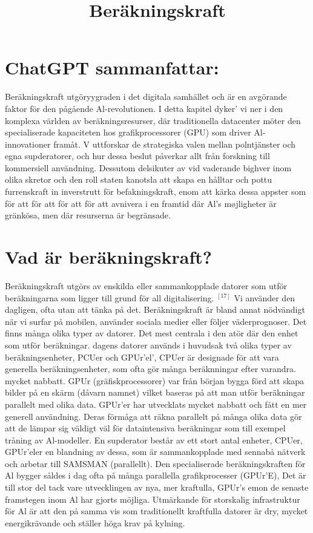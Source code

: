 {{{{{{{{{{{{{\title{
Beräkningskraft
}
\section*{ChatGPT sammanfattar:}
Beräkningskraft utgöryygraden i det digitala samhället och är en avgörande faktor för den pågående Al-revolutionen.
I detta kapitel dyker' vi ner i den komplexa världen av beräkningsresurser, där traditionella datacenter möter den specialiserade kapaciteten hos grafikprocessorer (GPU) som driver Al-innovationer framåt. V uttforskar de strategiska valen mellan polntjänster och egna supderatorer, och hur dessa beslut påverkar allt från forskning till kommersiell användning. Dessutom delsikuter av vid vaderande bighver inom olika skretor och den roll staten kanotsla att skapa en hålltar och pottu furrenskraft in inverstrutt för befakningskraft, enom att kärka dessa appster som för att för att för att för att avnivera i en framtid där Al's møjligheter är gränkösa, men där resurserna är begränsade.
\section*{Vad är beräkningskraft?}
Beräkningskraft utgörs av enskilda eller sammankopplade datorer som utför beräkningarna som ligger till grund för all digitalisering. \({ }^{[17]}\) Vi använder den dagligen, ofta utan att tänka på det. Beräkningskraft är bland annat nödvändigt när vi surfar på mobilen, använder sociala medier eller följer väderprognoser.
Det finns många olika typer av datorer. Det mest centrala i den atör där den enhet som utför beräkningar. dagens datorer används i huvudsak två olika typer av beräkningsenheter, PCUer och GPUr'el', CPUer är designade för att vara generella beräkningsenheter, som ofta gör många beräknningar efter varandra. mycket nabbatt. GPUr (gräfiskprocessorer) var från början bygga förd att skapa bilder på en skärm (dåvarn namnet) vilket baseras på att man utför beräkningar parallelt med olika data. GPUr'er har utvecklats mycket nabbatt och fått en mer generell användning. Deras förmåga att räkna parallelt på många olika data gör att de lämpar sig väldigt väl för dataintensiva beräkningar som till exempel tråning av Al-modeller. En supderator består av ett stort antal enheter, CPUer, GPUr'eler en blandning av dessa, som är sammankopplade med sennabå nätverk och arbetar till SAMSMAN (parallellt).
Den specialiserade beräkningskraften för Al bygger såldes i dag ofta på många parallella grafikprocesser (GPUr'E), Det är till stor del tack vare utvecklingen av nya, mer kraftulla, GPUr's emon de senaste framstegen inom Al har gjorts möjliga. Utmärkande för storskalig infrastruktur för Al är att den på samma
vis som traditionellt kraftfulla datorer är dry, mycket energikrävande och ställer höga krav på kylning.
}}}}}}}}}}}}}
